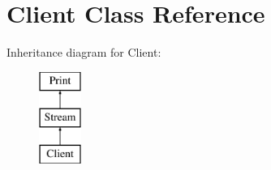 \hypertarget{class_client}{}\section{Client Class Reference}
\label{class_client}
Inheritance diagram for Client\+:\begin{figure}[H]
\begin{center}
\leavevmode
\includegraphics[height=3.000000cm]{class_client}
\end{center}
\end{figure}
